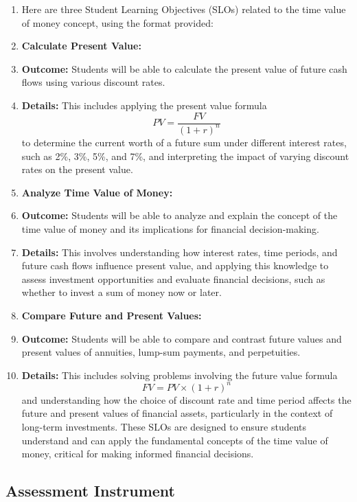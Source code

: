 \begin{enumerate}
    \item Here are three Student Learning Objectives (SLOs) related to the time value of money concept, using the format provided:
    \item \textbf{Calculate Present Value:}
    \item \textbf{Outcome:} Students will be able to calculate the present value of future cash flows using various discount rates.
    \item \textbf{Details:} This includes applying the present value formula $$PV = \frac{FV}{(1 + r)^n}$$ to determine the current worth of a future sum under different interest rates, such as 2\%, 3\%, 5\%, and 7\%, and interpreting the impact of varying discount rates on the present value.
    \item \textbf{Analyze Time Value of Money:}
    \item \textbf{Outcome:} Students will be able to analyze and explain the concept of the time value of money and its implications for financial decision-making.
    \item \textbf{Details:} This involves understanding how interest rates, time periods, and future cash flows influence present value, and applying this knowledge to assess investment opportunities and evaluate financial decisions, such as whether to invest a sum of money now or later.
    \item \textbf{Compare Future and Present Values:}
    \item \textbf{Outcome:} Students will be able to compare and contrast future values and present values of annuities, lump-sum payments, and perpetuities.
    \item \textbf{Details:} This includes solving problems involving the future value formula $$FV = PV \times (1 + r)^n$$ and understanding how the choice of discount rate and time period affects the future and present values of financial assets, particularly in the context of long-term investments. These SLOs are designed to ensure students understand and can apply the fundamental concepts of the time value of money, critical for making informed financial decisions.
\end{enumerate}


\subsection{Assessment Instrument}
\label{ssec:asse-3669}


